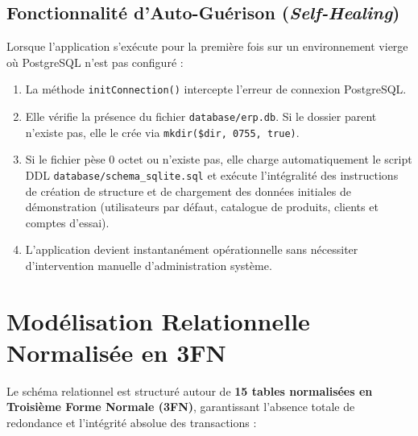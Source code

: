\documentclass[11pt,a4paper,titlepage,twoside,openright]{report}
\begin{document}
\subsection{Fonctionnalité d'Auto-Guérison (\emph{Self-Healing})}
Lorsque l'application s'exécute pour la première fois sur un environnement vierge où PostgreSQL n'est pas configuré :
\begin{enumerate}
    \item La méthode \texttt{initConnection()} intercepte l'erreur de connexion PostgreSQL.
    \item Elle vérifie la présence du fichier \texttt{database/erp.db}. Si le dossier parent n'existe pas, elle le crée via \texttt{mkdir(\$dir, 0755, true)}.
    \item Si le fichier pèse 0 octet ou n'existe pas, elle charge automatiquement le script DDL \texttt{database/schema\_sqlite.sql} et exécute l'intégralité des instructions de création de structure et de chargement des données initiales de démonstration (utilisateurs par défaut, catalogue de produits, clients et comptes d'essai).
    \item L'application devient instantanément opérationnelle sans nécessiter d'intervention manuelle d'administration système.
\end{enumerate}

\section{Modélisation Relationnelle Normalisée en 3FN}

Le schéma relationnel est structuré autour de \textbf{15 tables normalisées en Troisième Forme Normale (3FN)}, garantissant l'absence totale de redondance et l'intégrité absolue des transactions :
\end{document}
